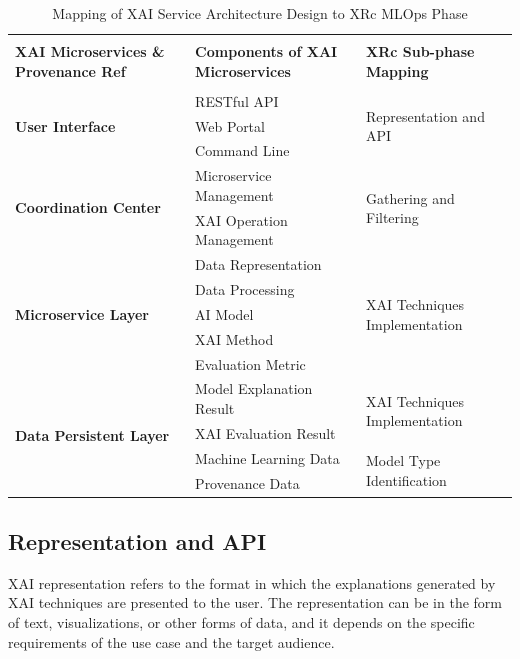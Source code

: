 \documentclass[conference]{IEEEtran}
\begin{document}
\begin{table}[htbp]
\caption{Mapping of XAI Service Architecture Design to XRc MLOps Phase}
\begin{center}
\label{Mapping}
\begin{tabular}{|l|l|l|}
\hline
 & & \\
\textbf{XAI Microservices \& Provenance Ref} & \textbf{Components of XAI Microservices}  & \textbf{XRc Sub-phase Mapping} \\
 & & \\ \hline
\multirow{3}{*}{\textbf{User Interface}} & RESTful API & \multirow{3}{*}{Representation and API} \\
 & Web Portal & \\
 & Command Line & \\ \hline 
\multirow{4}{*}{\textbf{Coordination Center}} & \multirow{2}{*}{Microservice Management} & \multirow{4}{*}{Gathering and Filtering} \\
 & & \\
 & \multirow{2}{*}{XAI Operation Management} & \\
 & & \\ \hline 
\multirow{5}{*}{\textbf{Microservice Layer}} & Data Representation & \multirow{5}{*}{XAI Techniques Implementation} \\
 & Data Processing & \\
 & AI Model & \\
 & XAI Method & \\
 & Evaluation Metric & \\ \hline
\multirow{4}{*}{\textbf{Data Persistent Layer}} & Model Explanation Result & \multirow{2}{*}{XAI Techniques Implementation} \\
 & XAI Evaluation Result & \\ \cline{2-3} 
 & Machine Learning Data & \multirow{2}{*}{Model Type Identification} \\
 & Provenance Data & \\ \hline
\end{tabular}
\end{center}
\end{table}
\subsection{Representation and API}
XAI representation refers to the format in which the explanations generated by XAI techniques are presented to the user. The representation can be in the form of text, visualizations, or other forms of data, and it depends on the specific requirements of the use case and the target audience.
\end{document}
